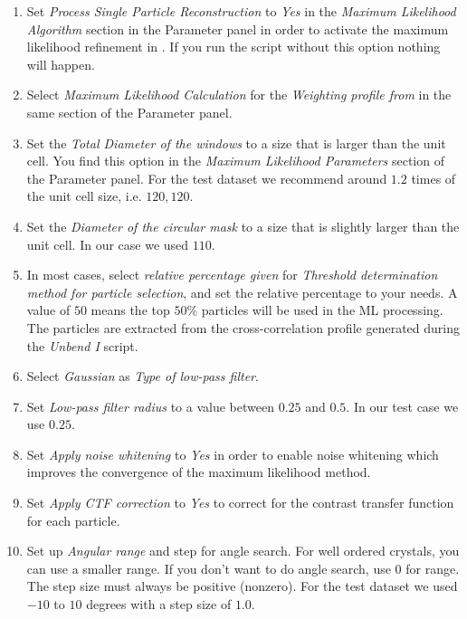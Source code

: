 \begin{enumerate}
	\item Set \textit{Process Single Particle Reconstruction} to \textit{Yes} in the \textit{Maximum Likelihood Algorithm} section in the Parameter panel in order to activate the maximum likelihood refinement in {\twodx}. If you run the script without this option nothing will happen.
	
	\item Select \textit{Maximum Likelihood Calculation} for the \textit{Weighting profile from} in the same section of the Parameter panel.
	
	\item Set the \textit{Total Diameter of the windows} to a size that is larger than the unit cell. You find this option in the \textit{Maximum Likelihood Parameters} section of the Parameter panel. For the test dataset we recommend around $1.2$ times of the unit cell size, i.e. $120, 120$.
	
	\item Set the \textit{Diameter of the circular mask} to a size that is slightly larger than the unit cell. In our case we used $110$.
	
	\item In most cases, select \textit{relative percentage given} for \textit{Threshold determination method for particle selection}, and set the relative percentage to your needs.  A value of $50$ means the top $50$\% particles will be used in the ML processing. The particles are extracted from the cross-correlation profile generated during the \textit{Unbend I} script.
	
	\item Select \textit{Gaussian} as \textit{Type of low-pass filter}.
	
	\item Set \textit{Low-pass filter radius} to a value between $0.25$ and $0.5$. In our test case we use $0.25$.
	
	\item Set \textit{Apply noise whitening} to \textit{Yes} in order to enable noise whitening which improves the convergence of the maximum likelihood method.
	
	\item Set \textit{Apply CTF correction} to \textit{Yes} to correct for the contrast transfer function for each particle.
	
	\item Set up \textit{Angular range} and step for angle search. For well ordered crystals, you can use a smaller range.  If you don't want to do angle search, use 0 for range. The step size must always be positive (nonzero). For the test dataset we used $-10$ to $10$ degrees with a step size of $1.0$.
	

\end{enumerate}
